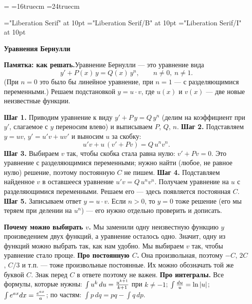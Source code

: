 \magnification=
\hsize=16truecm
\vsize=24truecm
\parindent=0pt
\baselineskip=14pt
\raggedright
{}

\font\tenrm="Liberation Serif" at 10pt
\font\tenbf="Liberation Serif/B" at 10pt
\font\tenit="Liberation Serif/I" at 10pt
\rm

\def\boxnum#1{\hbox{\vrule\vbox{\hrule\hbox{\strut\kern5pt{\bf#1}\kern5pt}\hrule}\vrule}}

\def\problem#1#2{\vskip0pt plus 60pt\penalty-400\bigskip
  \line{\boxnum{#1}\quad #2\hfil}\nobreak\smallskip}
\def\st#1{\medskip\noindent{\bf #1}\enspace\ignorespaces}
\def\ans#1{\medskip\noindent\hbox{\vrule\vbox{\hrule\hbox{\strut\kern5pt{\bf Ответ:}\enspace$\displaystyle #1$\kern5pt}\hrule}\vrule}\par}

\centerline{\bf Уравнения Бернулли}
\bigskip

{\bf Памятка: как решать.}\quad Уравнение Бернулли --- это уравнение вида
$$y'+P(x)\,y=Q(x)\,y^{n},\qquad n\ne0,\ n\ne1.$$
(При $n=0$ это было бы линейное уравнение, при $n=1$ --- с разделяющимися
переменными.) Решаем подстановкой $y=u\cdot v$, где $u(x)$ и $v(x)$ --- две
новые неизвестные функции.
\medskip

{\bf Шаг 1.} Приводим уравнение к виду $y'+P\,y=Q\,y^n$ (делим на коэффициент
при $y'$, слагаемое с $y$ переносим влево) и выписываем $P$, $Q$, $n$.
\smallskip
{\bf Шаг 2.} Подставляем $y=uv$, $y'=u'v+uv'$ и выносим $u$ за скобку:
$$u'v+u\,(v'+Pv)=Q\,u^nv^n.$$
{\bf Шаг 3.} Выбираем $v$ так, чтобы скобка стала равна нулю:
$v'+Pv=0$. Это уравнение с разделяющимися переменными; нужно найти
 (любое, не равное нулю) решение, поэтому постоянную $C$ не
пишем.
\smallskip
{\bf Шаг 4.} Подставляем найденное $v$ в оставшееся уравнение
$u'v=Q\,u^nv^n$. Получаем уравнение на $u$ с разделяющимися переменными.
Решаем его --- здесь появляется постоянная $C$.
\smallskip
{\bf Шаг 5.} Записываем ответ $y=u\cdot v$. Если $n>0$, то $y=0$ тоже решение
(его мы теряем при делении на $u^n$) --- его нужно отдельно проверить и
дописать.
\medskip

{\bf Почему можно выбирать $v$.} Мы заменили одну неизвестную функцию $y$
произведением двух функций, а уравнение осталось одно. Значит, одну из
функций можно выбрать так, как нам удобно. Мы выбираем $v$ так, чтобы
уравнение стало проще.
\smallskip
{\bf Про постоянную $C$.} Она произвольная, поэтому $-C$, $2C$, $C/3$ и т.\thinspace п.
--- тоже произвольные постоянные. Их можно обозначать той же буквой $C$.
Знак перед $C$ в ответе поэтому не важен.
\smallskip
{\bf Про интегралы.} Все формулы, которые нужны: $\int u^{k}\,du={u^{k+1}\over
k+1}$ при $k\ne-1$; $\int{du\over u}=\ln|u|$; $\int e^{ax}dx={e^{ax}\over a}$;
по частям: $\int p\,dq=pq-\int q\,dp$.

